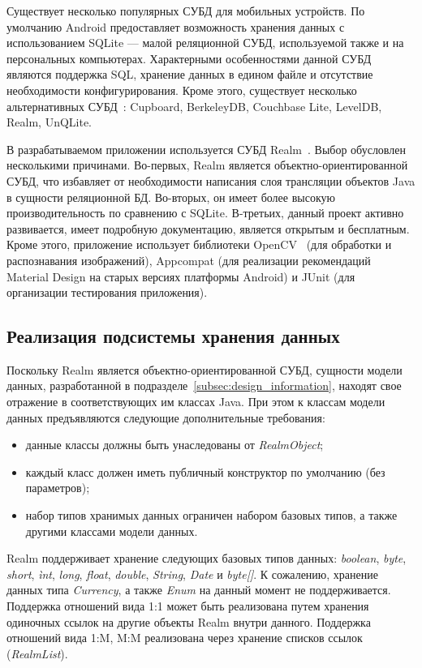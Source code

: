 Существует несколько популярных СУБД для мобильных устройств.
По умолчанию Android предоставляет возможность хранения
данных с использованием SQLite --- малой реляционной СУБД,
используемой также и на персональных компьютерах.
Характерными особенностями данной СУБД являются поддержка SQL,
хранение данных в едином файле и отсутствие необходимости конфигурирования.
Кроме этого, существует несколько альтернативных СУБД~\cite{mobile_db}:
Cupboard, BerkeleyDB, Couchbase Lite, LevelDB, Realm, UnQLite.

В разрабатываемом приложении используется СУБД Realm~\cite{realm_official}.
Выбор обусловлен несколькими причинами.
Во-первых, Realm является объектно-ориентированной СУБД,
что избавляет от необходимости написания слоя трансляции объектов Java
в сущности реляционной БД.
Во-вторых, он имеет более высокую производительность по сравнению с SQLite.
В-третьих, данный проект активно развивается, имеет подробную документацию,
является открытым и бесплатным.
Кроме этого, приложение использует библиотеки OpenCV~\cite{opencv}
(для обработки и распознавания изображений),
Appcompat (для реализации рекомендаций Material Design на старых версиях платформы Android)
и JUnit (для организации тестирования приложения).

\subsection{Реализация подсистемы хранения данных}
\label{subsec:implementation_db}

Поскольку Realm является объектно-ориентированной СУБД,
сущности модели данных, разработанной в подразделе~\ref{subsec:design_information},
находят свое отражение в соответствующих им классах Java.
При этом к классам модели данных предъявляются следующие дополнительные требования:
\begin{itemize}
  \item данные классы должны быть унаследованы от \textit{RealmObject};
  \item каждый класс должен иметь публичный конструктор по умолчанию (без параметров);
  \item набор типов хранимых данных ограничен набором базовых типов,
    а также другими классами модели данных.
\end{itemize}

Realm поддерживает хранение следующих базовых типов данных:
\textit{boolean}, \textit{byte}, \textit{short}, \textit{ìnt},
\textit{long}, \textit{float}, \textit{double}, \textit{String},
\textit{Date} и \textit{byte[]}.
К сожалению, хранение данных типа \textit{Currency}, а также
\textit{Enum} на данный момент не поддерживается.
Поддержка отношений вида 1:1 может быть реализована
путем хранения одиночных ссылок на другие объекты Realm внутри данного.
Поддержка отношений вида 1:M, M:M
реализована через хранение списков ссылок (\textit{RealmList}).

